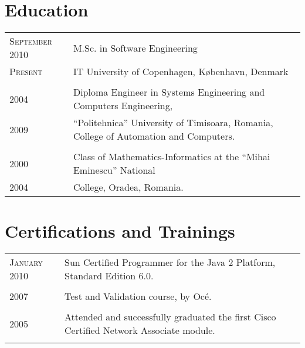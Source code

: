 \documentclass[a4paper,10pt]{article}
\begin{document}
\section{Education}
\begin{tabular}{p{2.5cm}|p{11cm}}
\raggedleft \textsc{September 2010} & M.Sc. in Software Engineering
\\ \raggedleft \textsc{Present} & IT University of Copenhagen,
København, Denmark \\ \multicolumn{2}{c}{} \\
\raggedleft \textsc{2004} & Diploma Engineer in Systems Engineering and
Computers Engineering, \\ \raggedleft \textsc{2009} & ``Politehnica'' University of Timisoara, Romania, College of Automation and
Computers.
\\\multicolumn{2}{c}{} \\ \raggedleft \textsc{2000} & Class of Mathematics-Informatics at the
``Mihai Eminescu'' National \\ \raggedleft \textsc{2004} &
College, Oradea, Romania.\\
\end{tabular}

\section{Certifications and Trainings}
\begin{tabular}{p{2.5cm}|p{11cm}}
\raggedleft \textsc{January 2010} & Sun Certified Programmer for the Java 2
Platform, Standard Edition 6.0. 
\\
\multicolumn{2}{c}{}
\\
 \raggedleft \textsc{2007} & Test and Validation course, by Oc\'e.\\
\multicolumn{2}{c}{} 
\\ 
\raggedleft  \textsc{2005} & Attended and successfully
graduated the first Cisco Certified Network Associate module.\\ \multicolumn{2}{c}{} \\
\end{tabular}

\end{document}
